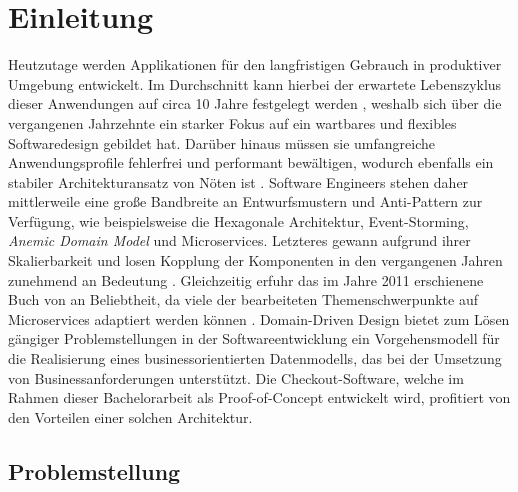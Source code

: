 

\chapter{Einleitung}

Heutzutage werden Applikationen für den langfristigen Gebrauch in produktiver Umgebung entwickelt. Im Durchschnitt kann hierbei der erwartete Lebenszyklus dieser Anwendungen auf circa 10 Jahre festgelegt werden \cite{Tamai.1992}, weshalb sich über die vergangenen Jahrzehnte ein starker Fokus auf ein wartbares und flexibles Softwaredesign gebildet hat. Darüber hinaus müssen sie umfangreiche Anwendungsprofile fehlerfrei und performant bewältigen, wodurch ebenfalls ein stabiler Architekturansatz von Nöten ist \cite{Bosch.2001}. Software Engineers stehen daher mittlerweile eine große Bandbreite an Entwurfsmustern und Anti-Pattern zur Verfügung, wie beispielsweise die Hexagonale Architektur, Event-Storming, \emph{\Gls{Anemic Domain Model}} und Microservices. Letzteres gewann aufgrund ihrer Skalierbarkeit und losen Kopplung der Komponenten in den vergangenen Jahren zunehmend an Bedeutung \cite{oreilly.Microservices, Sampaio.2017}. Gleichzeitig erfuhr das im Jahre 2011 erschienene Buch  von \citeauthor{Evans.2011} an Beliebtheit, da viele der bearbeiteten Themenschwerpunkte auf Microservices adaptiert werden können \cite[S. 130ff.]{Vernon.2015}\cite{Microservice.DDD.2017}. Domain-Driven Design bietet zum Lösen gängiger Problemstellungen in der Softwareentwicklung ein Vorgehensmodell für die Realisierung eines businessorientierten Datenmodells, das bei der Umsetzung von Businessanforderungen unterstützt. Die Checkout-Software, welche im Rahmen dieser Bachelorarbeit als Proof-of-Concept entwickelt wird, profitiert von den Vorteilen einer solchen Architektur. 

\section{Problemstellung}

